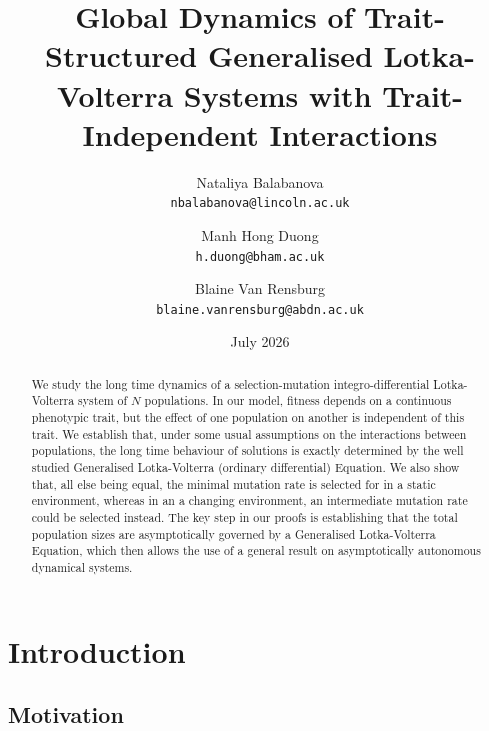 \documentclass{article}
\title{Global Dynamics of Trait-Structured Generalised Lotka-Volterra Systems with Trait-Independent Interactions}
\author{
  Nataliya Balabanova\\
\texttt{nbalabanova@lincoln.ac.uk}
  \and
  Manh Hong Duong\\
  \texttt{h.duong@bham.ac.uk}
\and
 Blaine Van Rensburg\\
\texttt{blaine.vanrensburg@abdn.ac.uk}
}
\date{July 2026}
\begin{document}
\maketitle
\begin{abstract}
We study the long time dynamics of a selection-mutation integro-differential Lotka-Volterra system of $N$ populations. In our model, fitness depends on a continuous phenotypic trait, but the effect of one population on another is independent of this trait. We establish that, under some usual assumptions on the interactions between populations, the long time behaviour of solutions is exactly determined by the well studied Generalised Lotka-Volterra (ordinary differential) Equation. We also show that, all else being equal, the minimal mutation rate is selected for in a static environment, whereas in an a changing environment, an intermediate mutation rate could be selected instead. The key step in our proofs is establishing that the total population sizes are asymptotically governed by a Generalised Lotka-Volterra Equation, which then allows the use of a general result on asymptotically autonomous dynamical systems.  
\end{abstract}
\section{Introduction}

\subsection{Motivation}
\end{document}

